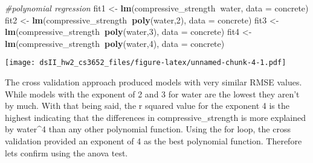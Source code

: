 \documentclass[]{article}
\newenvironment{Shaded}{\begin{snugshade}}{\end{snugshade}}
\newcommand{\KeywordTok}[1]{\textcolor[rgb]{0.13,0.29,0.53}{\textbf{#1}}}
\newcommand{\DataTypeTok}[1]{\textcolor[rgb]{0.13,0.29,0.53}{#1}}
\newcommand{\DecValTok}[1]{\textcolor[rgb]{0.00,0.00,0.81}{#1}}
\newcommand{\StringTok}[1]{\textcolor[rgb]{0.31,0.60,0.02}{#1}}
\newcommand{\CommentTok}[1]{\textcolor[rgb]{0.56,0.35,0.01}{\textit{#1}}}
\newcommand{\OtherTok}[1]{\textcolor[rgb]{0.56,0.35,0.01}{#1}}
\newcommand{\ControlFlowTok}[1]{\textcolor[rgb]{0.13,0.29,0.53}{\textbf{#1}}}
\newcommand{\OperatorTok}[1]{\textcolor[rgb]{0.81,0.36,0.00}{\textbf{#1}}}
\newcommand{\NormalTok}[1]{#1}
\begin{document}
\begin{Shaded}
\begin{Highlighting}[]
\CommentTok{#polynomial regression}
\NormalTok{fit1 <-}\StringTok{ }\KeywordTok{lm}\NormalTok{(compressive_strength}\OperatorTok{~}\NormalTok{water, }\DataTypeTok{data =}\NormalTok{ concrete)}
\NormalTok{fit2 <-}\StringTok{ }\KeywordTok{lm}\NormalTok{(compressive_strength}\OperatorTok{~}\KeywordTok{poly}\NormalTok{(water,}\DecValTok{2}\NormalTok{), }\DataTypeTok{data =}\NormalTok{ concrete) }
\NormalTok{fit3 <-}\StringTok{ }\KeywordTok{lm}\NormalTok{(compressive_strength}\OperatorTok{~}\KeywordTok{poly}\NormalTok{(water,}\DecValTok{3}\NormalTok{), }\DataTypeTok{data =}\NormalTok{ concrete) }
\NormalTok{fit4 <-}\StringTok{ }\KeywordTok{lm}\NormalTok{(compressive_strength}\OperatorTok{~}\KeywordTok{poly}\NormalTok{(water,}\DecValTok{4}\NormalTok{), }\DataTypeTok{data =}\NormalTok{ concrete) }
\end{Highlighting}
\end{Shaded}

\begin{Shaded}
\end{Shaded}

\texttt{[image: dsII\_hw2\_cs3652\_files/figure-latex/unnamed-chunk-4-1.pdf]}

The cross validation approach produced models with very similar RMSE
values. While models with the exponent of 2 and 3 for water are the
lowest they aren't by much. With that being said, the r squared value
for the exponent 4 is the highest indicating that the differences in
compressive\_strength is more explained by water\^{}4 than any other
polynomial function. Using the for loop, the cross validation provided
an exponent of 4 as the best polynomial function. Therefore lets confirm
using the anova test.
\end{document}
